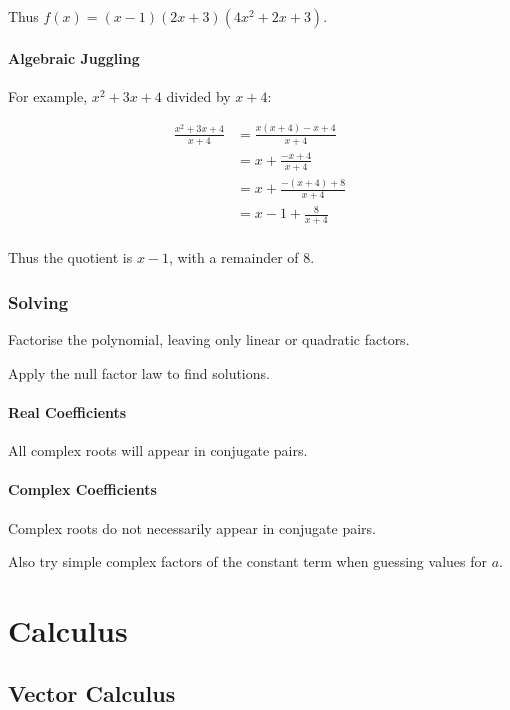 \documentclass[a4paper,11pt]{report}
\begin{document}
Thus $f(x) = (x - 1)(2x + 3)(4x^2 + 2x + 3)$.

\subsubsection{Algebraic Juggling}

For example, $x^2 + 3x + 4$ divided by $x + 4$:

$$
\begin{aligned}
\frac{x^2 + 3x + 4}{x + 4} & = \frac{x(x + 4) - x + 4}{x + 4} \\
& = x + \frac{-x + 4}{x + 4} \\
& = x + \frac{-(x + 4) + 8}{x + 4} \\
& = x - 1 + \frac{8}{x + 4} \\
\end{aligned}
$$

Thus the quotient is $x - 1$, with a remainder of $8$.

\subsection{Solving}

Factorise the polynomial, leaving only linear or quadratic factors.

Apply the null factor law to find solutions.

\subsubsection{Real Coefficients}

All complex roots will appear in conjugate pairs.

\subsubsection{Complex Coefficients}

Complex roots do not necessarily appear in conjugate pairs.

Also try simple complex factors of the constant term when guessing values for
$a$.




\chapter{Calculus}

\section{Vector Calculus}
\end{document}
